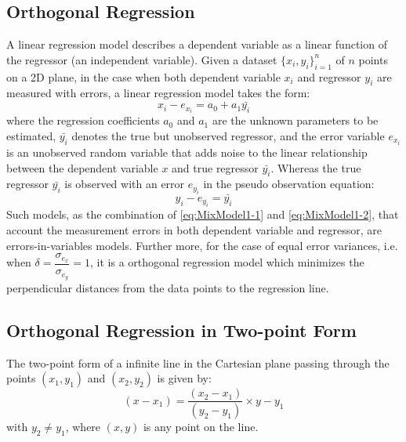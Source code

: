 \subsection{Orthogonal Regression}
\label{subsec:OrthogonalRegression}
A linear regression model describes a dependent variable as a linear function of the regressor (an independent variable). Given a dataset $\{x_i,y_i\}^n_{i=1}$ of $n$ points on a 2D plane, in the case when both dependent variable $x_i$ and regressor $y_i$ are measured with errors, a linear regression model takes the form:
\begin{equation} \label{eq:MixModel1-1}
x_i - e_{x_i} = %
a_0 + a_1\bar{y_i}
\end{equation}
where the regression coefficients $a_0$ and $a_1$ are the unknown parameters to be estimated, $\bar{y_i}$ denotes the true but unobserved regressor, and the error variable $e_{x_i}$ is an unobserved random variable that adds noise to the linear relationship between the dependent variable $x$ and true regressor $\bar{y_i}$. Whereas the true regressor $\bar{y_i}$ is observed with an error $e_{y_i}$ in the pseudo observation equation:
\begin{equation} \label{eq:MixModel1-2}
y_i-e_{y_i} = \bar{y_i}
\end{equation}
Such models, as the combination of \eqref{eq:MixModel1-1} and \eqref{eq:MixModel1-2}, that account the measurement errors in both dependent variable and regressor, are errors-in-variables models. Further more, for the case of equal error variances, i.e. when $\delta=\dfrac{\sigma_{e_x}}{\sigma_{e_y}}=1$, it is a orthogonal regression model which minimizes the %
perpendicular distances from the data points to the regression line.


\subsection{Orthogonal Regression in Two-point Form}
\label{subsec:NonLinear}

The two-point form of a infinite line in the Cartesian plane passing through the points $(x_1,y_1)$ and $(x_2,y_2)$ is given by:
\begin{equation} \label{eq:LineInTwoPointForm}
(x-x_1) = \dfrac{(x_2-x_1)}{(y_2-y_1)}\times y-y_1
\end{equation}
with $y_2\neq y_1$, where $(x,y)$ is any point on the line.

